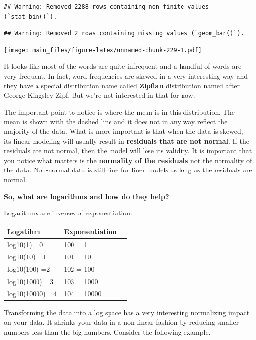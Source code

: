 \documentclass[
]{book}
\begin{document}
\begin{verbatim}
## Warning: Removed 2288 rows containing non-finite values (`stat_bin()`).
\end{verbatim}

\begin{verbatim}
## Warning: Removed 2 rows containing missing values (`geom_bar()`).
\end{verbatim}

\texttt{[image: main\_files/figure-latex/unnamed-chunk-229-1.pdf]}

It looks like most of the words are quite infrequent and a handful of words are very frequent. In fact, word frequencies are skewed in a very interesting way and they have a special distribution name called \textbf{Zipfian} distribution named after George Kingsley Zipf. But we're not interested in that for now.

The important point to notice is where the mean is in this distribution. The mean is shown with the dashed line and it does not in any way reflect the majority of the data. What is more important is that when the data is skewed, its linear modeling will usually result in \textbf{residuals that are not normal}. If the residuals are not normal, then the model will lose its validity. It is important that you notice what matters is the \textbf{normality of the residuals} not the normality of the data. Non-normal data is still fine for liner models as long as the residuals are normal.

\textbf{So, what are logarithms and how do they help?}

Logarithms are inverses of exponentiation.

\begin{longtable}[]{@{}lll@{}}
\toprule\noalign{}
\textbf{Logatihm} & \textbf{Exponentiation} & \\
\midrule\noalign{}
\endhead
\bottomrule\noalign{}
\endlastfoot
log10(1) =0 & 100 = 1 & \\
log10(10) =1 & 101 = 10 & \\
log10(100) =2 & 102 = 100 & \\
log10(1000) =3 & 103 = 1000 & \\
log10(10000) =4 & 104 = 10000 & \\
\end{longtable}

Transforming the data into a log space has a very interesting normalizing impact on your data. It shrinks your data in a non-linear fashion by reducing smaller numbers less than the big numbers. Consider the following example.
\end{document}
